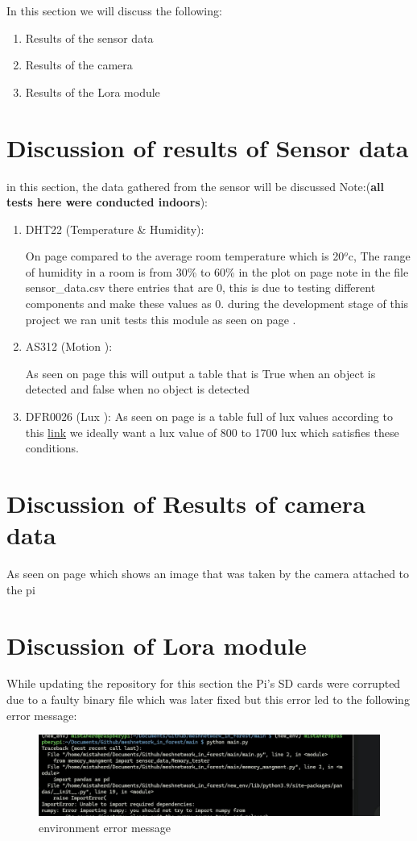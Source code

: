 In this section we will discuss the following:
\begin{enumerate}
    \item Results of the sensor data
    \item Results of the camera
    \item Results of the Lora module
\end{enumerate}
\section{Discussion of results of Sensor data}
in this section, the data gathered from the sensor will be discussed Note:(\textbf{all tests here were conducted indoors}):
\begin{enumerate}
    \item DHT22 (Temperature \& Humidity):

    On page \pageref{Recorded data from  DHT22 on the 5th of March} compared to the average room temperature which is  20$^o$c, The range of humidity in a room is from 30\% to 60\% in the plot on page \pageref{Temperature and Humidity plotted overtime} note in the file sensor\_data.csv there entries that are 0, this is due to testing different components and make these values as  0. during the development stage of this project we ran unit tests this module as seen on page \pageref{unit test message for DHT22 module}.
    \item AS312 (Motion ):

    As seen on page \pageref{Recorded data from AS312 on the \today} this will output a table that is True when an object is detected and  false when no object is  detected

    \item DFR0026 (Lux ):
    As seen on page \pageref{Recorded data from DFR0026 on the 25th of March 2024} is a table full of lux values according to this \href{https://www.thoughtco.com/lighting-levels-by-room-1206643}{link} we ideally want a lux value of  800 to 1700 lux which satisfies these conditions.
\end{enumerate}
\section{Discussion of Results of camera data}
As seen on page \pageref{A photo from 25th of March 2024} which shows  an image that was taken by the camera  attached to  the pi
\newpage
\section{Discussion of Lora module}
\label{Discussion of Lora module}
While updating the repository for this section the Pi's SD cards were corrupted due to  a faulty binary file which was  later fixed  but  this error led to the following error message:

\begin{figure}[h!]
    \centering
    \includegraphics[width=0.5\linewidth]{Images/error_message.jpeg}
    \caption{environment error message}
    \label{environment error message}
\end{figure}